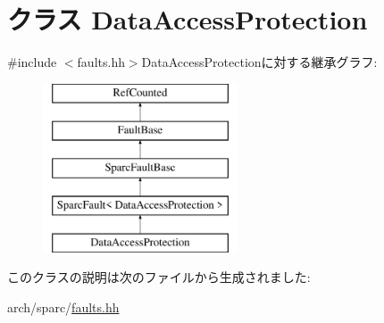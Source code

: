 \hypertarget{classSparcISA_1_1DataAccessProtection}{
\section{クラス DataAccessProtection}
\label{classSparcISA_1_1DataAccessProtection}
}


{\ttfamily \#include $<$faults.hh$>$}DataAccessProtectionに対する継承グラフ:\begin{figure}[H]
\begin{center}
\leavevmode
\includegraphics[height=5cm]{classSparcISA_1_1DataAccessProtection}
\end{center}
\end{figure}


このクラスの説明は次のファイルから生成されました:\begin{DoxyCompactItemize}
\item 
arch/sparc/\hyperlink{arch_2sparc_2faults_8hh}{faults.hh}\end{DoxyCompactItemize}
